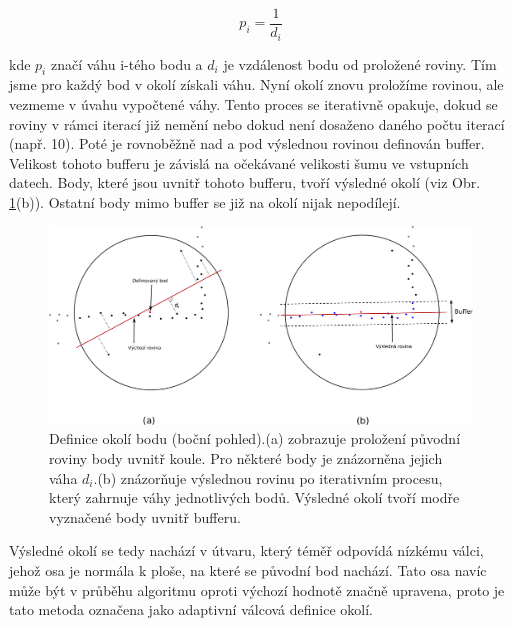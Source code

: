 \documentclass[11pt,twoside,a4paper]{book}
\begin{document}
\begin{equation}
p_i = \frac{1}{d_i}
\label{eq:vypocet-vahy}
\end{equation}

\noindent
kde $p_i$ značí váhu i-tého bodu a  $d_i$ je vzdálenost bodu od proložené roviny. Tím jsme pro každý bod v okolí získali váhu. Nyní okolí znovu proložíme rovinou, ale vezmeme v úvahu vypočtené váhy. Tento proces  se iterativně opakuje, dokud se roviny v rámci iterací již nemění nebo dokud není dosaženo daného počtu iterací (např. 10). Poté je rovnoběžně nad a pod výslednou rovinou definován buffer. Velikost tohoto bufferu je závislá na očekávané velikosti šumu ve vstupních datech. Body, které jsou uvnitř tohoto bufferu, tvoří výsledné okolí (viz Obr. \ref{fig:definice-okoli}(b)). Ostatní body mimo buffer se již na okolí nijak nepodílejí.

\begin{figure}[ht]
\begin{center}
\includegraphics[width=\textwidth]{figures/definice-okoli}
\caption{Definice okolí bodu (boční pohled).\newline (a) zobrazuje proložení původní roviny body uvnitř koule. Pro některé body je znázorněna jejich váha $d_i$.\newline (b) znázorňuje výslednou rovinu po iterativním procesu, který zahrnuje váhy jednotlivých bodů. Výsledné okolí tvoří modře vyznačené body uvnitř bufferu.}
\label{fig:definice-okoli}
\end{center}
\end{figure}

Výsledné okolí se tedy nachází v útvaru, který téměř odpovídá nízkému válci, jehož osa je normála k ploše, na které se původní bod nachází. Tato osa navíc může být v průběhu algoritmu oproti výchozí hodnotě značně upravena, proto je tato metoda označena jako adaptivní válcová definice okolí. 
\end{document}
